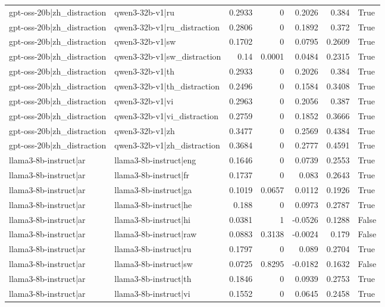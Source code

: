 \begin{table}
\begin{tabular}{l l r r r r l}
gpt-oss-20b|zh_distraction & qwen3-32b-v1|ru & 0.2933 & 0 & 0.2026 & 0.384 & True \\
gpt-oss-20b|zh_distraction & qwen3-32b-v1|ru_distraction & 0.2806 & 0 & 0.1892 & 0.372 & True \\
gpt-oss-20b|zh_distraction & qwen3-32b-v1|sw & 0.1702 & 0 & 0.0795 & 0.2609 & True \\
gpt-oss-20b|zh_distraction & qwen3-32b-v1|sw_distraction & 0.14 & 0.0001 & 0.0484 & 0.2315 & True \\
gpt-oss-20b|zh_distraction & qwen3-32b-v1|th & 0.2933 & 0 & 0.2026 & 0.384 & True \\
gpt-oss-20b|zh_distraction & qwen3-32b-v1|th_distraction & 0.2496 & 0 & 0.1584 & 0.3408 & True \\
gpt-oss-20b|zh_distraction & qwen3-32b-v1|vi & 0.2963 & 0 & 0.2056 & 0.387 & True \\
gpt-oss-20b|zh_distraction & qwen3-32b-v1|vi_distraction & 0.2759 & 0 & 0.1852 & 0.3666 & True \\
gpt-oss-20b|zh_distraction & qwen3-32b-v1|zh & 0.3477 & 0 & 0.2569 & 0.4384 & True \\
gpt-oss-20b|zh_distraction & qwen3-32b-v1|zh_distraction & 0.3684 & 0 & 0.2777 & 0.4591 & True \\
llama3-8b-instruct|ar & llama3-8b-instruct|eng & 0.1646 & 0 & 0.0739 & 0.2553 & True \\
llama3-8b-instruct|ar & llama3-8b-instruct|fr & 0.1737 & 0 & 0.083 & 0.2643 & True \\
llama3-8b-instruct|ar & llama3-8b-instruct|ga & 0.1019 & 0.0657 & 0.0112 & 0.1926 & True \\
llama3-8b-instruct|ar & llama3-8b-instruct|he & 0.188 & 0 & 0.0973 & 0.2787 & True \\
llama3-8b-instruct|ar & llama3-8b-instruct|hi & 0.0381 & 1 & -0.0526 & 0.1288 & False \\
llama3-8b-instruct|ar & llama3-8b-instruct|raw & 0.0883 & 0.3138 & -0.0024 & 0.179 & False \\
llama3-8b-instruct|ar & llama3-8b-instruct|ru & 0.1797 & 0 & 0.089 & 0.2704 & True \\
llama3-8b-instruct|ar & llama3-8b-instruct|sw & 0.0725 & 0.8295 & -0.0182 & 0.1632 & False \\
llama3-8b-instruct|ar & llama3-8b-instruct|th & 0.1846 & 0 & 0.0939 & 0.2753 & True \\
llama3-8b-instruct|ar & llama3-8b-instruct|vi & 0.1552 & 0 & 0.0645 & 0.2458 & True \\

\end{tabular}
\end{table}
